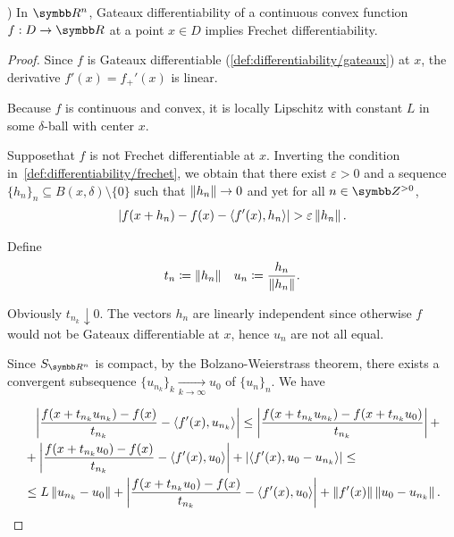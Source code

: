 \begin{theorem}\label{thm:rn_continuous_convex_gateaux_implies_frechet}\cite[exercise 1.15(a]{Phelps1993})
  In \( \R^n \), Gateaux differentiability of a continuous convex function \( f: D \to \R \) at a point \( x \in D \) implies Frechet differentiability.
\end{theorem}
\begin{proof}
  Since \( f \) is Gateaux differentiable (\cref{def:differentiability/gateaux}) at \( x \), the derivative \( f'(x) = f_+'(x) \) is linear.

  Because \( f \) is continuous and convex, it is locally Lipschitz with constant \( L \) in some \( \delta \)-ball with center \( x \).

  Suppose\LEM that \( f \) is not Frechet differentiable at \( x \). Inverting the condition in~\cref{def:differentiability/frechet}, we obtain that there exist \( \varepsilon > 0 \) and a sequence \( \{ h_n \}_n \subseteq B(x, \delta) \setminus \{ 0 \} \) such that \( \left\Vert h_n \right\Vert \to 0 \) and yet for all \( n \in \Z^{>0} \),
  \begin{align}\label{thm:rn_continuous_convex_gateaux_implies_frechet/frechet_assumption}
    \left\vert f(x + h_n) - f(x) - \left\langle f'(x), h_n \right\rangle \right\vert > \varepsilon \left\Vert h_n \right\Vert.
  \end{align}

  Define
  \begin{align*}
    t_n \coloneqq \left\Vert h_n \right\Vert
    &&
    u_n \coloneqq \frac{h_n} {\left\Vert h_n \right\Vert}.
  \end{align*}

  Obviously \( t_{n_k} \downarrow 0 \). The vectors \( h_n \) are linearly independent since otherwise \( f \) would not be Gateaux differentiable at \( x \), hence \( u_n \) are not all equal.

  Since \( S_{\R^n} \) is compact\USC, by the Bolzano-Weierstrass theorem, there exists a convergent subsequence \( \{ u_{n_k} \}_k \underset {k \to \infty} \to u_0 \) of \( \{ u_n \}_n \). We have

  \begin{align}\label{thm:rn_continuous_convex_gateaux_implies_frechet/frechet_estimate}
    &\phantom= \Abs{\frac {f(x + t_{n_k} u_{n_k}) - f(x)} {t_{n_k}} - \Prod{f'(x)} {u_{n_k}}}
    \leq \nonumber
    \Abs{\frac {f(x + t_{n_k} u_{n_k}) - f(x + t_{n_k} u_0)} {t_{n_k}}} + \\ &+ \Abs{\frac {f(x + t_{n_k} u_0) - f(x)} {t_{n_k}} - \Prod{f'(x)} {u_0}} + \Abs{\Prod{f'(x)} {u_0 - u_{n_k}}}
    \leq \nonumber \\ &\leq
    L \Norm{u_{n_k} - u_0} + \Abs{\frac {f(x + t_{n_k} u_0) - f(x)} {t_{n_k}} - \Prod{f'(x)} {u_0}} + \Norm{f'(x)} \Norm{u_0 - u_{n_k}}.
  \end{align}


\end{proof}
